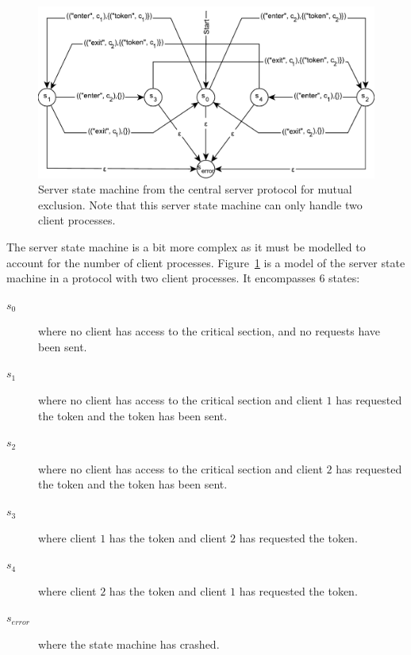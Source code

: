 \documentclass{article}
\begin{document}
		\FloatBarrier
		\begin{figure}[ht!]
			\center
			\includegraphics[width=\textwidth]{figures/state-machines/CSME-server-NFA.pdf}
			\caption{Server state machine from the central server protocol for mutual exclusion. Note that this server state machine can only handle two client processes.}
			\label{fig:CSME-server-NFA}
		\end{figure}
		\FloatBarrier

		The server state machine is a bit more complex as it must be modelled to account for the number of client processes.
		Figure~\ref{fig:CSME-server-NFA} is a model of the server state machine in a protocol with two client processes.
		It encompasses 6 states:
		\begin{description}
			\item[$s_0$] where no client has access to the critical section, and no requests have been sent.
			\item[$s_1$] where no client has access to the critical section and client $1$ has requested the token and the token has been sent.
			\item[$s_2$] where no client has access to the critical section and client $2$ has requested the token and the token has been sent.
			\item[$s_3$] where client $1$ has the token and client $2$ has requested the token.
			\item[$s_4$] where client $2$ has the token and client $1$ has requested the token.
			\item[$s_{error}$] where the state machine has crashed.
		\end{description}
\end{document}
